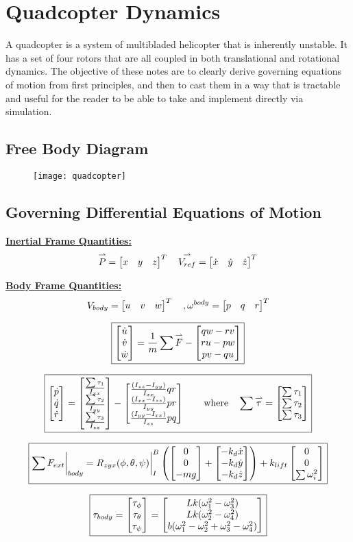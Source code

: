 \newpage


\section{Quadcopter Dynamics}

A quadcopter is a system of multibladed helicopter that is inherently unstable. It has a set of four rotors that are all coupled in both translational and rotational dynamics. The objective of these notes are to clearly derive governing equations of motion from first principles, and then to cast them in a way that is tractable and useful for the reader to be able to take and implement directly via simulation. 

\subsection{Free Body Diagram}

\begin{figure}[!h]
    \label{fig:quad}
    \texttt{[image: quadcopter]}
\end{figure} 

\subsection{Governing Differential Equations of Motion}

\underline{\textbf{Inertial Frame Quantities:}}
$$\overset{\rightharpoonup}{P} = \begin{bmatrix} x & y & z \end{bmatrix}^{T} \quad \overset{\rightharpoonup}{V_{ref}} = \begin{bmatrix} \dot{x} & \dot{y} & \dot{z} \end{bmatrix}^{T}$$

\underline{\textbf{Body Frame Quantities:}}
$$ V_{body} = \begin{bmatrix} u & v & w \end{bmatrix}^{T} \quad , \omega^{body} = \begin{bmatrix} p & q & r \end{bmatrix}^{T}$$


$$\boxed{\begin{bmatrix} \dot{u} \\ \dot{v} \\ \dot{w} \end{bmatrix} = \frac{1}{m}\sum\overset{\rightharpoonup}{F} - \begin{bmatrix} q w - r v \\ r u -p w \\ p v - q u \end{bmatrix}} $$

$$\boxed{ \begin{bmatrix} \dot{p} \\ \dot{q} \\ \dot{r} \end{bmatrix} = \begin{bmatrix} \frac{\sum\tau_{1}}{I_{xx}} \\ \frac{\sum\tau_{2}}{I_{yy}} \\ \frac{\sum\tau_{3}}{I_{zz}} \end{bmatrix} - \begin{bmatrix} \frac{(I_{zz} - I_{yy})}{I_{xx}}qr \\ \frac{(I_{xx} - I_{zz})}{I_{yy}}pr \\ \frac{(I_{yy}- I_{xx})}{I_{zz}}pq \end{bmatrix} \quad \quad \text{where} \quad \sum\overset{\rightharpoonup}{\tau} = \begin{bmatrix} \sum\tau_{1} \\ \sum\tau_{2} \\ \sum\tau_{3} \end{bmatrix}}$$

$$\boxed{\sum F_{ext} \biggr\rvert_{body}= R_{zyx}(\phi, \theta, \psi)\biggr\rvert_{I}^{B}\left(\begin{bmatrix} 0 \\ 0 \\ -mg \end{bmatrix} + \begin{bmatrix} -k_d\dot{x} \\ -k_d\dot{y} \\ -k_d\dot{z} \end{bmatrix}\right) + k_{lift}\begin{bmatrix} 0 \\ 0 \\ \sum\omega_{i}^{2} \end{bmatrix} }$$

$$\boxed{\tau_{body} = \begin{bmatrix} \tau_{\phi} \\ \tau_{\theta} \\ \tau_{\psi} \end{bmatrix} = \begin{bmatrix} Lk(\omega_{1}^{2} - \omega_{3}^{2}) \\ Lk(\omega_{2}^{2} - \omega_{4}^{2}) \\ b(\omega_{1}^{2}- \omega_{2}^{2} + \omega_{3}^{2} - \omega_{4}^{2}) \end{bmatrix}}$$

